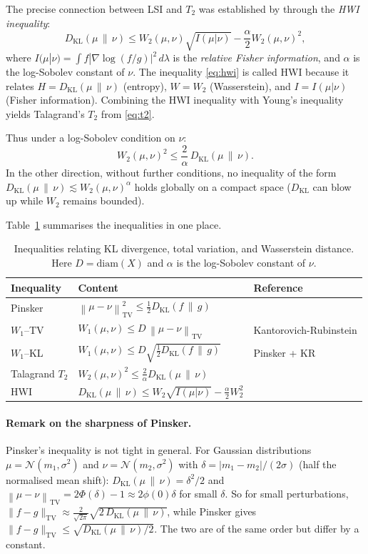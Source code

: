 \documentclass[12pt]{article}
\newcommand{\KL}[2]{D_{\mathrm{KL}}\!\left(#1\,\|\,#2\right)}
\newcommand{\TV}[2]{\left\|#1 - #2\right\|_{\mathrm{TV}}}
\begin{document}
The precise connection between LSI and $T_2$ was established by
\citet{OttoVillani2000} through the \emph{HWI inequality}:
\begin{equation}\label{eq:hwi}
  \KL{\mu}{\nu}
  \leq W_2(\mu,\nu)\sqrt{I(\mu|\nu)}
  - \frac{\alpha}{2}W_2(\mu,\nu)^2,
\end{equation}
where $I(\mu|\nu) = \int f|\nabla\log(f/g)|^2\,d\lambda$ is the
\emph{relative Fisher information}, and $\alpha$ is the
log-Sobolev constant of $\nu$.  The inequality \eqref{eq:hwi}
is called HWI because it relates $H = \KL{\mu}{\nu}$
(entropy), $W = W_2$ (Wasserstein),  and $I = I(\mu|\nu)$
(Fisher information).  Combining the HWI inequality with
Young's inequality yields Talagrand's $T_2$ from
\eqref{eq:t2}.

Thus under a log-Sobolev condition on $\nu$:
\[
  W_2(\mu,\nu)^2 \leq \frac{2}{\alpha}\,\KL{\mu}{\nu}.
\]
In the other direction, without further conditions, no inequality
of the form $\KL{\mu}{\nu} \lesssim W_2(\mu,\nu)^\alpha$ holds
globally on a compact space ($D_{\mathrm{KL}}$ can blow up while $W_2$
remains bounded).

Table~\ref{tab:inequalities} summarises the inequalities in
one place.

\begin{table}[ht]
\centering
\caption{Inequalities relating KL divergence, total variation,
and Wasserstein distance.  Here $D = \mathrm{diam}(X)$ and
$\alpha$ is the log-Sobolev constant of $\nu$.}
\label{tab:inequalities}
\medskip
\begin{tabular}{p{5.2cm}p{5.2cm}l}
\toprule
Inequality & Content & Reference \\
\midrule
Pinsker & $\TV{\mu}{\nu}^2 \leq \frac{1}{2}\KL{f}{g}$ &
  \citealt{CoverThomas2006} \\[4pt]
$W_1$--TV & $W_1(\mu,\nu) \leq D\,\TV{\mu}{\nu}$ &
  Kantorovich-Rubinstein \\[4pt]
$W_1$--KL & $W_1(\mu,\nu) \leq D\sqrt{\frac{1}{2}\KL{f}{g}}$ &
  Pinsker + KR \\[4pt]
Talagrand $T_2$ & $W_2(\mu,\nu)^2 \leq \frac{2}{\alpha}\KL{\mu}{\nu}$
  & \citealt{Talagrand1996} \\[4pt]
HWI & $\KL{\mu}{\nu} \leq W_2\sqrt{I(\mu|\nu)} -
  \frac{\alpha}{2}W_2^2$ & \citealt{OttoVillani2000} \\
\bottomrule
\end{tabular}
\end{table}

\paragraph{Remark on the sharpness of Pinsker.}
Pinsker's inequality is not tight in general.  For Gaussian
distributions $\mu = \mathcal{N}(m_1, \sigma^2)$ and
$\nu = \mathcal{N}(m_2, \sigma^2)$ with $\delta =
|m_1 - m_2|/(2\sigma)$ (half the normalised mean shift):
$\KL{\mu}{\nu} = \delta^2 / 2$ and
$\TV{\mu}{\nu} = 2\Phi(\delta) - 1 \approx 2\phi(0)\delta$
for small $\delta$.  So for small perturbations,
$\|f-g\|_{\mathrm{TV}} \approx \frac{2}{\sqrt{2\pi}}\sqrt{2\,\KL{\mu}{\nu}}$, while Pinsker
gives $\|f-g\|_{\mathrm{TV}} \leq \sqrt{\KL{\mu}{\nu}/2}$.  The two are of the same order
but differ by a constant.
\end{document}
